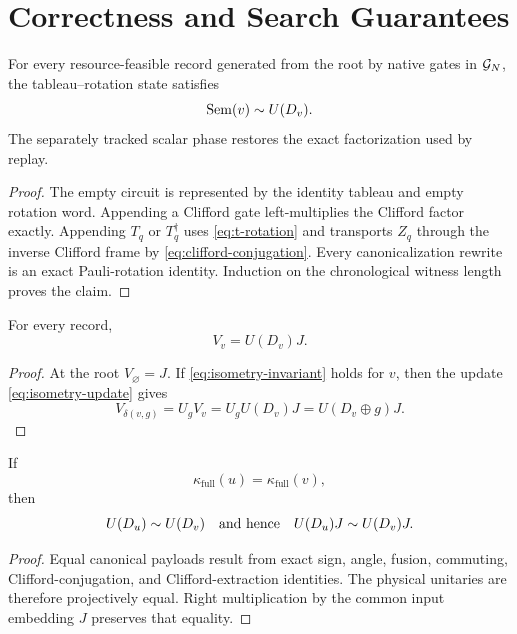 \section{Correctness and Search Guarantees}

\begin{theorem}
For every resource-feasible record generated from the root by native gates in $\mathcal{G}_N$, the tableau--rotation state satisfies
\begin{equation}
\operatorname{Sem}(v)\mathrel{\sim} U(D_v).
\end{equation}
The separately tracked scalar phase restores the exact factorization used by replay.
\end{theorem}
\begin{proof}
The empty circuit is represented by the identity tableau and empty rotation word. Appending a Clifford gate left-multiplies the Clifford factor exactly. Appending $T_q$ or $T_q^\dagger$ uses \eqref{eq:t-rotation} and transports $Z_q$ through the inverse Clifford frame by \eqref{eq:clifford-conjugation}. Every canonicalization rewrite is an exact Pauli-rotation identity. Induction on the chronological witness length proves the claim.
\end{proof}

\begin{lemma}
For every record,
\begin{equation}
V_v=U(D_v)J.
\label{eq:isometry-invariant}
\end{equation}
\end{lemma}
\begin{proof}
At the root $V_\varnothing=J$. If \eqref{eq:isometry-invariant} holds for $v$, then the update \eqref{eq:isometry-update} gives
\begin{equation}
V_{\delta(v,g)}=U_gV_v=U_gU(D_v)J=U(D_v\oplus g)J.
\end{equation}
\end{proof}

\begin{proposition}
If
\begin{equation}
\kappa_{\mathrm{full}}(u)=\kappa_{\mathrm{full}}(v),
\end{equation}
then
\begin{equation}
U(D_u)\mathrel{\sim} U(D_v)
\quad\text{and hence}\quad
U(D_u)J\mathrel{\sim} U(D_v)J.
\end{equation}
\end{proposition}
\begin{proof}
Equal canonical payloads result from exact sign, angle, fusion, commuting, Clifford-conjugation, and Clifford-extraction identities. The physical unitaries are therefore projectively equal. Right multiplication by the common input embedding $J$ preserves that equality.
\end{proof}

